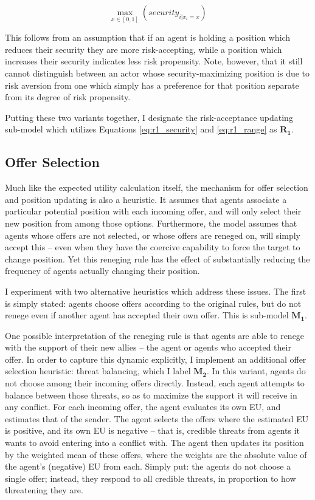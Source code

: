 \begin{equation}
    \max\limits_{x \in {[0, 1]}} (security_{i|x_i=x}) \label{eq:r1_range}
\end{equation}

This follows from an assumption that if an agent is holding a position which reduces their security they are more risk-accepting, while a position which increases their security indicates less risk propensity. Note, however, that it still cannot distinguish between an actor whose security-maximizing position is due to risk aversion from one which simply has a preference for that position separate from its degree of risk propensity. 

Putting these two variants together, I designate the risk-acceptance updating sub-model which utilizes Equations \ref{eq:r1_security} and \ref{eq:r1_range} as $\mathbf{R_1}$.

\subsection{Offer Selection}

Much like the expected utility calculation itself, the mechanism for offer selection and position updating is also a heuristic. It assumes that agents associate a particular potential position with each incoming offer, and will only select their new position from among those options. Furthermore, the model assumes that agents whose offers are not selected, or whose offers are reneged on, will simply accept this -- even when they have the coercive capability to force the target to change position. Yet this reneging rule has the effect of substantially reducing the frequency of agents actually changing their position.

I experiment with two alternative heuristics which address these issues. The first is simply stated: agents choose offers according to the original rules, but do not renege even if another agent has accepted their own offer. This is sub-model $\mathbf{M_1}$.

One possible interpretation of the reneging rule is that agents are able to renege with the support of their new allies -- the agent or agents who accepted their offer. In order to capture this dynamic explicitly, I implement an additional offer selection heuristic: threat balancing, which I label $\mathbf{M_2}$. In this variant, agents do not choose among their incoming offers directly. Instead, each agent attempts to balance between those threats, so as to maximize the support it will receive in any conflict. For each incoming offer, the agent evaluates its own EU, and estimates that of the sender. The agent selects the offers where the estimated EU is positive, and its own EU is negative -- that is, credible threats from agents it wants to avoid entering into a conflict with. The agent then updates its position by the weighted mean of these offers, where the weights are the absolute value of the agent's (negative) EU from each. Simply put: the agents do not choose a single offer; instead, they respond to all credible threats, in proportion to how threatening they are.

